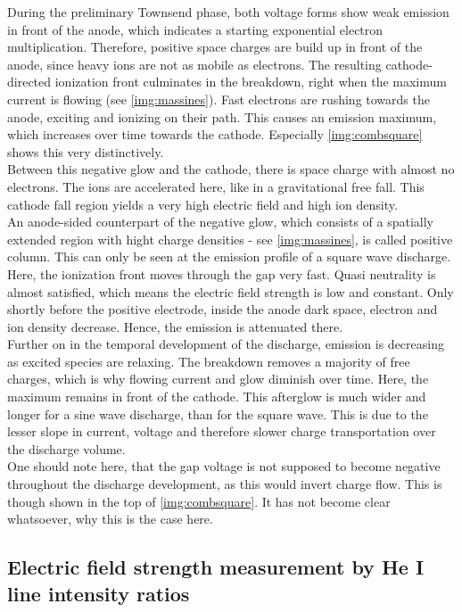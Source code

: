 \documentclass[a4paper,10pt,twoside]{article}
\begin{document}
	\begin{multicols*}{2}
			
		During the preliminary Townsend phase, both voltage forms show weak emission in front of the anode, which indicates a starting exponential electron multiplication. Therefore, positive space charges are build up in front of the anode, since heavy ions are not as mobile as electrons. The resulting cathode-directed ionization front culminates in the breakdown, right when the maximum current is flowing (see \autoref{img:massines}). Fast electrons are rushing towards the anode, exciting and ionizing on their path. This causes an emission maximum, which increases over time towards the cathode. Especially \autoref{img:combsquare} shows this very distinctively.\\
		Between this negative glow and the cathode, there is space charge with almost no electrons. The ions are accelerated here, like in a gravitational free fall. This cathode fall region yields a very high electric field and high ion density.\\
		An anode-sided counterpart of the negative glow, which consists of a spatially extended region with hight charge densities - see \autoref{img:massines}, is called positive column. This can only be seen at the emission profile of a square wave discharge. Here, the ionization front moves through the gap very fast. Quasi neutrality is almost satisfied, which means the electric field strength is low and constant. Only shortly before the positive electrode, inside the anode dark space, electron and ion density decrease. Hence, the emission is attenuated there.\\
		Further on in the temporal development of the discharge, emission is decreasing as excited species are relaxing. The breakdown removes a majority of free charges, which is why flowing current and glow diminish over time. Here, the maximum remains in front of the cathode. This afterglow is much wider and longer for a sine wave discharge, than for the square wave. This is due to the lesser slope in current, voltage and therefore slower charge transportation over the discharge volume.\\
		One should note here, that the gap voltage is not supposed to become negative throughout the discharge development, as this would invert charge flow. This is though shown in the top of \autoref{img:combsquare}. It has not become clear whatsoever, why this is the case here.
			
	\subsection{Electric field strength measurement by He I line intensity ratios}
				

\end{multicols*}
\end{document}
